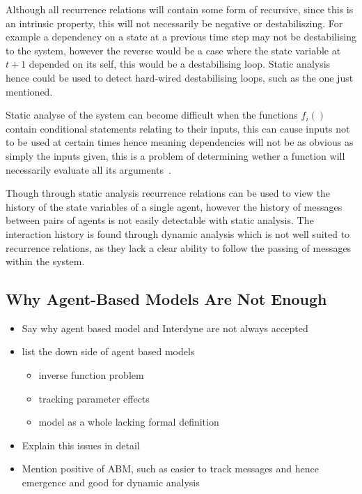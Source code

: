 \documentclass{article}
\begin{document}
Although all recurrence relations will contain some form of recursive, since this is an intrinsic property, this will not necessarily be negative or destabiliszing. For example a dependency on a state at a previous time step may not be destabilising to the system, however the reverse would be a case where the state variable at $t+1$ depended on its self, this would be a destabilising loop. Static analysis hence could be used to detect hard-wired destabilising loops, such as the one just mentioned.

Static analyse of the system can become difficult when the functions $f_{i}()$ contain conditional statements relating to their inputs, this can cause inputs not to be used at certain times hence meaning dependencies will not be as obvious as simply the inputs given, this is a problem of determining wether a function will necessarily evaluate all its arguments~\cite{willevaluteargsa}.

Though through static analysis recurrence relations can be used to view the history of the state variables of a single agent, however the history of messages between pairs of agents is not easily detectable with static analysis. The interaction history is found through dynamic analysis which is not well suited to recurrence relations, as they lack a clear ability to follow the passing of messages within the system.   








\subsection{Why Agent-Based Models Are Not Enough} \label{Iinterdynenotenough}

\begin{itemize}
  \item Say why agent based model and Interdyne are not always accepted
  \item list the down side of agent based models \begin{itemize}
  \item inverse function problem
  \item tracking parameter effects
  \item model as a whole lacking formal definition 
\end{itemize}
  \item Explain this issues in detail 
  \item Mention positive of ABM, such as easier to track messages and hence emergence and good for dynamic analysis 
\end{itemize}
\end{document}
